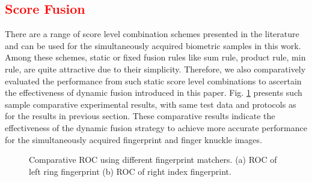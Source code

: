 \textcolor{red}{\subsection{Score Fusion}}
There are a range of score level combination schemes presented in the literature and can be used for the simultaneously acquired biometric samples in this work. Among these schemes, static or fixed fusion rules like sum rule, product rule, min rule, are quite attractive due to their simplicity. Therefore, we also comparatively evaluated the performance from such static score level combinations to ascertain the effectiveness of dynamic fusion introduced in this paper. Fig. \ref{compare-fusion} presents such sample comparative experimental results, with same test data and  protocols as for the results in previous section. These comparative results indicate the effectiveness of the dynamic fusion strategy to achieve more accurate performance for the simultaneously acquired fingerprint and finger knuckle images.

\begin{figure}[h]
    \centering
    \caption{Comparative ROC using different fingerprint matchers. (a) ROC of left ring fingerprint (b) ROC of right index fingerprint.}
    \label{compare-fusion}
\end{figure}

